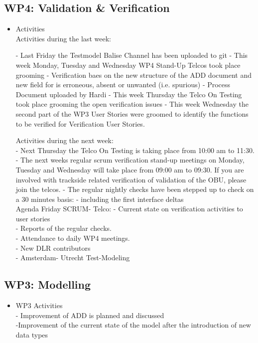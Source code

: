\documentclass[a4paper, 11pt]{article}
\begin{document}
\subsection{WP4: Validation \& Verification}
\begin{itemize}
\item Activities\\
Activities during the last week: 
  
-  Last Friday the Testmodel Balise Channel has been uploaded to git 
- This week Monday, Tuesday and Wednesday WP4 Stand-Up Telcos took place grooming  - Verification baes on the new structure of the ADD document and new field for is erroneous, absent or unwanted (i.e. spurious) 
 - Process Document uploaded by Hardi 
-  This week Thursday the Telco On Testing took place grooming the open verification issues 
-      This week Wednesday the second part of the WP3 User Stories were groomed to identify the functions to be verified for Verification User Stories. 
  
  
  
Activities during the next week: \\
  
-        Next Thursday the Telco On Testing is taking place from 10:00 am  to 11:30. 
-     The next weeks regular scrum verification stand-up meetings on Monday, Tuesday and Wednesday will take place from 09:00 am to 09:30.
If you are involved with trackside related verification of validation of the OBU, please join the telcos. 
-    The regular nightly checks have been stepped up to check on a 30 minutes basis: 
       - including the first interface deltas \\
      
  
  
Agenda Friday SCRUM- Telco: 
-       Current state on verification activities to user stories \\
-    Reports of the regular checks. \\
-    Attendance to daily WP4 meetings. \\
-     New DLR contributors \\
-    Amsterdam- Utrecht Test-Modeling \\
\end{itemize}

\subsection{WP3: Modelling}

\begin{itemize}
\item WP3 Activities\\
- Improvement of ADD is planned and discussed\\
-Improvement of the current state of the model after the introduction of new data types\\


\end{itemize}
\end{document}
